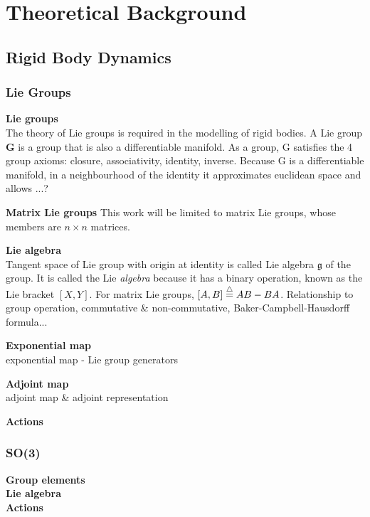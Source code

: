 \section{Theoretical Background}

\subsection{Rigid Body Dynamics}
	\subsubsection{Lie Groups}		
		\textbf{Lie groups}\\
		The theory of Lie groups is required in the modelling of rigid bodies.
		A Lie group $\mathbf{G}$ is a group that is also a differentiable manifold.
		As a group, G satisfies the 4 group axioms: closure, associativity, identity, inverse. 
		Because G is a differentiable manifold, in a neighbourhood of the identity it approximates euclidean space and allows ...?
		
		\textbf{Matrix Lie groups}
		This work will be limited to matrix Lie groups, whose members  are $n \times n$ matrices.
		
		\textbf{Lie algebra}\\
		Tangent space of Lie group with origin at identity is called Lie algebra $\mathfrak{g} $ of the group. It is called the Lie \textit{algebra} because it has a binary operation, known as the Lie bracket $[X,Y]$. For matrix Lie groups, $[A,B] \buildrel\triangle\over = AB-BA$. Relationship to group operation, commutative \& non-commutative, Baker-Campbell-Hausdorff formula...
		
		\textbf{Exponential map}\\		
		exponential map - Lie group generators
			
		\textbf{Adjoint map}\\			
		adjoint map \& adjoint representation
		
		\textbf{Actions}
		
	\subsubsection{\textbf{SO}(3)}	
	
		\textbf{Group elements}\\
		
		\textbf{Lie algebra}\\
		
		\textbf{Actions}\\
		

